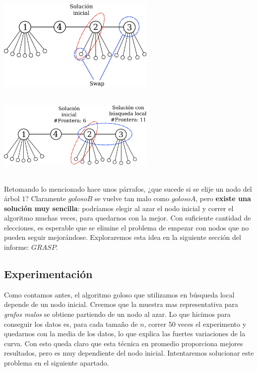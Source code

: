 {\centering
    \includegraphics[width=0.57\textwidth]{informe/imgs/local_base_nodes_v2.png} \\
}
$ $\newline

{\centering
    \includegraphics[width=0.57\textwidth]{informe/imgs/local_base_nodes_v3.png} \\
}
$ $\newline

Retomando lo mencionado hace unos párrafos, ¿que sucede si se elije un nodo del árbol $1$? Claramente $golosoB$ se vuelve tan malo como $golosoA$, pero \textbf{existe una solución muy sencilla}: podríamos elegir al azar el nodo inicial y correr el algoritmo muchas veces, para quedarnos con la mejor. Con suficiente cantidad de elecciones, es esperable que se elimine el problema de empezar con nodos que no pueden seguir mejorándose. Exploraremos esta idea en la siguiente sección del informe: $GRASP$.

\subsection{Experimentación}

Como contamos antes, el algoritmo goloso que utilizamos en búsqueda local depende de un nodo inicial. Creemos que la muestra mas representativa para \textit{grafos malos} se obtiene partiendo de un nodo al azar. Lo que hicimos para conseguir los datos es, para cada tamaño de $n$, correr 50 veces el experimento y quedarnos con la media de los datos, lo que explica las fuertes variaciones de la curva. Con esto queda claro que esta técnica en promedio proporciona mejores resultados, pero es muy dependiente del nodo inicial. Intentaremos solucionar este problema en el siguiente apartado. \\

